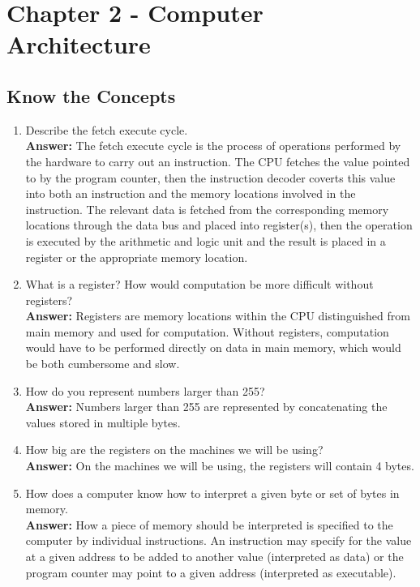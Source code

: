 \documentclass[12pt]{article}
\begin{document}
\section*{Chapter 2 - Computer Architecture}

\subsection*{Know the Concepts}
\begin{enumerate}
    \item Describe the fetch execute cycle. \\
	    \textbf{Answer:} The fetch execute cycle is the process of operations performed by the hardware to carry out an instruction. The CPU fetches the value pointed to by the program counter, then the instruction decoder coverts this value into both an instruction and the memory locations involved in the instruction. The relevant data is fetched from the corresponding memory locations through the data bus and placed into register(s), then the operation is executed by the arithmetic and logic unit and the result is placed in a register or the appropriate memory location.
    \item What is a register? How would computation be more difficult without registers? \\
        \textbf{Answer:} Registers are memory locations within the CPU distinguished from main memory and used for computation. Without registers, computation would have to be performed directly on data in main memory, which would be both cumbersome and slow.
    \item How do you represent numbers larger than 255? \\
        \textbf{Answer:} Numbers larger than 255 are represented by concatenating the values stored in multiple bytes.
    \item How big are the registers on the machines we will be using? \\
        \textbf{Answer:} On the machines we will be using, the registers will contain 4 bytes.
    \item How does a computer know how to interpret a given byte or set of bytes in memory. \\
        \textbf{Answer:} How a piece of memory should be interpreted is specified to the computer by individual instructions. An instruction may specify for the value at a given address to be added to another value (interpreted as data) or the program counter may point to a given address (interpreted as executable).

\end{enumerate}
\end{document}
